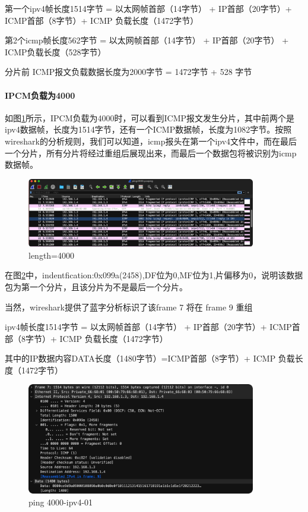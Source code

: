 \documentclass[a4paper,12pt]{report}
\begin{document}
\begin{spacing}{1.5}
第一个ipv4帧长度1514字节 = 以太网帧首部（14字节） + IP首部（20字节）+ ICMP首部（8字节）+ ICMP 负载长度（1472字节）

第2个icmp帧长度562字节 = 以太网帧首部（14字节） + IP首部（20字节） + ICMP负载长度（528字节）

分片前 ICMP报文负载数据长度为2000字节 = 1472字节 + 528 字节

\paragraph{IPCM负载为4000} 

如图\ref{pic:4000}所示，IPCM负载为4000时，可以看到ICMP报文发生分片，其中前两个是ipv4数据帧，长度为1514字节，还有一个ICMP数据帧，长度为1082字节。按照wireshark的分析规则，我们可以知道，icmp报头在第一个ipv4文件中，而在最后一个分片，所有分片将经过重组后展现出来，而最后一个数据包将被识别为icmp数据帧。

\begin{figure}[htb!]
  \centering
\includegraphics[width=10cm]{figure/ping4000.png}
\caption{length=4000}
\label{pic:4000}
\end{figure}

在图\ref{pic:4000-ipv4-01}中，indentfication:0x099a(2458),DF位为0,MF位为1,片偏移为0，说明该数据包为第一个分片，且该分片为不是最后一个分片。

当然，wireshark提供了蓝字分析标识了该frame 7 将在 frame 9 重组

ipv4帧长度1514字节 = 以太网帧首部（14字节） + IP首部（20字节）+ ICMP首部（8字节）+ ICMP 负载长度（1472字节）

其中的IP数据内容DATA长度（1480字节）=ICMP首部（8字节）+ ICMP 负载长度（1472字节）

\begin{figure}[htb!]
  \centering
\includegraphics[width=10cm]{figure/4000_ipv4_01.png}
\caption{ping 4000-ipv4-01}
\label{pic:4000-ipv4-01}
\end{figure}


\end{spacing}
\end{document}
